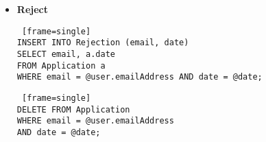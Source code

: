 \documentclass{article}
\begin{document}
\begin{itemize}
\begin{itemize}
\begin{itemize}
\begin{Verbatim} [frame=single]
                SELECT 1 FROM DogBreed db 
                JOIN Breed b ON db.name = b.name 
                WHERE db.dogID = d.dogID 
                AND b.name LIKE '%Terrier%'
            ) 
        THEN TRUE 
        ELSE FALSE 
    END AS is_fee_waived, 
    @decDate, 
    @dogID
FROM Application a
JOIN Dog d ON d.dogID = @dogID
LEFT JOIN (
    SELECT d.dogID, SUM(e.amount) AS total_expense
    FROM Expense e
    JOIN Dog d ON e.dogID = d.dogID
    GROUP BY d.dogID
) e ON e.dogID = @dogID
WHERE a.email = @user.emailAddress AND a.date = @date;
            \end{Verbatim}
            \begin{Verbatim} [frame=single]
DELETE FROM Application 
WHERE email = @user.emailAddress 
AND date = @date;
            \end{Verbatim}
            \item \textbf{Reject}
            \begin{Verbatim} [frame=single]
INSERT INTO Rejection (email, date)
SELECT email, a.date
FROM Application a
WHERE email = @user.emailAddress AND date = @date;
            \end{Verbatim}
            \begin{Verbatim} [frame=single]
DELETE FROM Application 
WHERE email = @user.emailAddress 
AND date = @date;
            \end{Verbatim}
        \end{itemize}
    \end{itemize}
\end{itemize}
\end{document}
